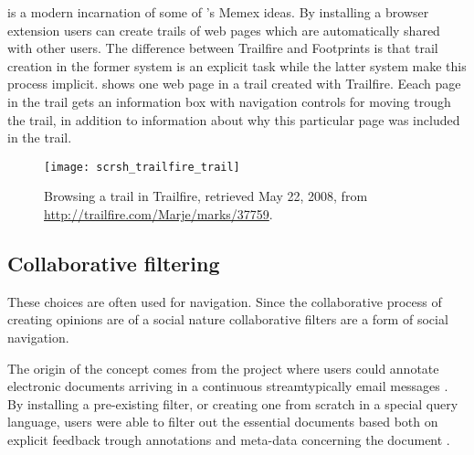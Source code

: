%
is a modern incarnation of some of \citeauthor{bush45}'s Memex ideas.
By installing a browser extension users can
create trails of web pages which are automatically shared with other users.
The difference between Trailfire and Footprints is that trail creation in the
former system is an explicit task while the latter system make this process
implicit.  shows one web page in a trail
created with Trailfire. Eeach page in the trail gets an information box with
navigation controls for moving trough the trail, in addition to information
about why this particular page was included in the trail.

\begin{figure}
  \texttt{[image: scrsh\_trailfire\_trail]}
  \caption[Trailfire Trail]{
    Browsing a trail in Trailfire,
    retrieved May 22, 2008, from
    \url{http://trailfire.com/Marje/marks/37759}.
  }
  \label{figure:scrsh.trailfire.trail}
\end{figure}

\subsection{Collaborative filtering}
\label{section:background.social.navigation.applied.forms.collaborative.filtering}

 
These choices are often used for navigation. Since the collaborative process
of creating opinions are of a social nature collaborative filters are a form
of social navigation.

The origin of the concept comes from the 
project where users could annotate electronic documents arriving in a
continuous stream\dash{}typically email messages \citep[]{goldberg92}. By
installing a pre-existing filter, or creating one from scratch in a
special query language, users were able to filter out the essential documents
based both on explicit feedback trough annotations and
meta-data concerning the document \citep[]{goldberg92}.

